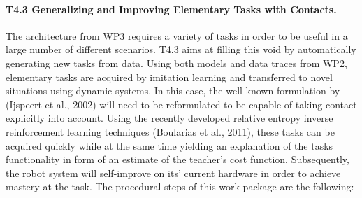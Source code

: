 \documentclass[12pt,a4paper,twoside]{report}
\begin{document}
\paragraph{T4.3 Generalizing and Improving Elementary Tasks with Contacts.} 
The architecture from WP3 requires a variety of tasks in order to be useful in a large number of different
scenarios. T4.3 aims at filling this void by automatically generating new tasks from data. Using both models
and data traces from WP2, elementary tasks are acquired by imitation learning and transferred to novel
situations using dynamic systems. In this case, the well-known formulation by (Ijspeert et al., 2002) will
need to be reformulated to be capable of taking contact explicitly into account. Using the recently
developed relative entropy inverse reinforcement learning techniques (Boularias et al., 2011), these tasks
can be acquired quickly while at the same time yielding an explanation of the tasks functionality in form of
an estimate of the teacher's cost function. Subsequently, the robot system will self-improve on its' current
hardware in order to achieve mastery at the task. The procedural steps of this work package are the
following:
\end{document}
